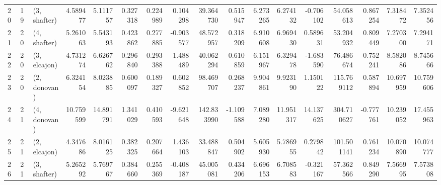 \begin{tabular}{lllrrrrrrrrrrrrrr}
20 &    19 &  (3, shafter) &   4.589477 &   5.111757 &   0.327318 &  0.224989 &  0.104298 &   39.364730 &  0.515947 &   6.273265 &   6.274132 &  -0.706102 &   54.058613 &  0.867254 &   7.318472 &   7.352456 \\
21 &    20 &  (4, shafter) &   5.261063 &   5.543193 &   0.423862 &  0.277885 & -0.903577 &   48.572957 &  0.318209 &   6.910608 &   6.969430 &   0.589631 &   53.204932 &  0.809449 &   7.270300 &   7.294171 \\
22 &    20 &  (3, elcajon) &   4.731274 &   6.626762 &   0.296840 &  0.293388 &  1.488489 &   40.062294 &  0.610859 &   6.151967 &   6.329478 &  -1.683590 &   76.486674 &  0.752241 &   8.582086 &   8.745666 \\
23 &    20 &  (2, donovan) &   6.324154 &   8.023885 &   0.600097 &  0.189327 &  0.602852 &   98.469707 &  0.268237 &   9.904861 &   9.923190 &   1.150122 &  115.769112 &  0.587894 &  10.697959 &  10.759606 \\
24 &    21 &  (4, donovan) &  10.759599 &  14.891791 &   1.341029 &  0.410593 & -9.621648 &  142.833990 & -1.109588 &   7.089280 &  11.951317 &  14.137625 &  304.710627 & -0.777761 &  10.239052 &  17.455963 \\
25 &    21 &  (2, elcajon) &   4.347686 &   8.016125 &   0.382325 &  0.207664 &  1.436103 &   33.488847 &  0.504902 &   5.605930 &   5.786955 &   0.279842 &  101.501141 &  0.761234 &  10.070890 &  10.074777 \\
26 &    21 &  (3, shafter) &   5.265292 &   5.769767 &   0.384660 &  0.255369 & -0.408187 &   45.005081 &  0.434206 &   6.696153 &   6.708583 &  -0.321167 &   57.362566 &  0.849290 &   7.566995 &   7.573808 \\
\bottomrule
\end{tabular}
